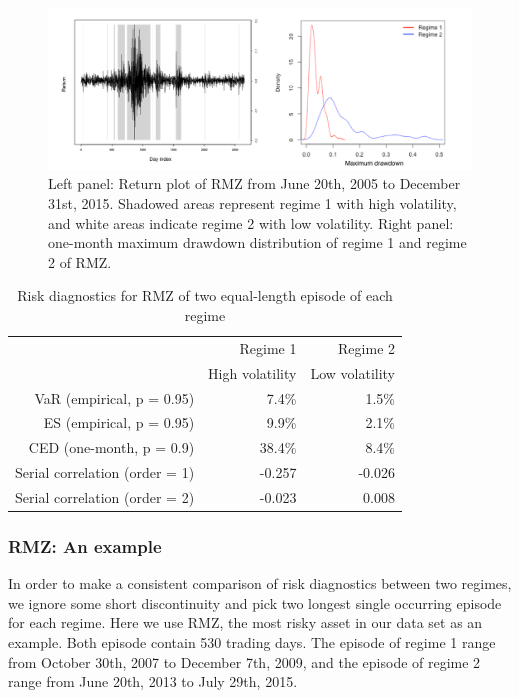 \documentclass[11pt]{article}
\begin{document}
\begin{figure}[H]
    \centering
    \includegraphics[width=1\textwidth]{../results/regime/RMZ_regime}
    \caption{Left panel: Return plot of RMZ from June 20th, 2005 to December 31st, 2015. Shadowed areas represent regime 1 with high volatility, and white areas indicate regime 2 with low volatility. Right panel: one-month maximum drawdown distribution of regime 1 and regime 2 of RMZ.}
    \label{fig: RMZregime}
\end{figure}

\begin{table}[H]
    \centering 
    \begin{tabular}{| r | r | r |} 
        \hline
        & Regime 1 & Regime 2 \\
        & High volatility & Low volatility \\
        \hline 
        VaR (empirical, p = 0.95) & 7.4\% & 1.5\% \\
        ES (empirical, p = 0.95) & 9.9\% & 2.1\% \\
        CED (one-month, p = 0.9) & 38.4\% & 8.4\% \\
        Serial correlation (order = 1) & -0.257 & -0.026 \\
        Serial correlation (order = 2) & -0.023 & 0.008 \\
        \hline
    \end{tabular}
    \caption{Risk diagnostics for RMZ of two equal-length episode of each regime} 
    \label{table:ridkDiagsRegimeRMZ}
\end{table}

\subsubsection{RMZ: An example}

In order to make a consistent comparison of risk diagnostics between two regimes, we ignore some short discontinuity and pick two longest single occurring episode for each regime. Here we use RMZ, the most risky asset in our data set as an example. Both episode contain 530 trading days. The episode of regime 1 range from October 30th, 2007 to December 7th, 2009, and the episode of regime 2 range from June 20th, 2013 to July 29th, 2015. 
\end{document}
